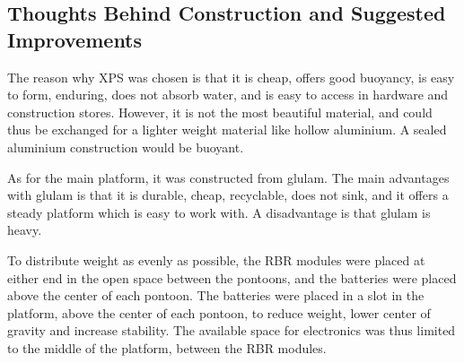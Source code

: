 \subsection{Thoughts Behind Construction and Suggested Improvements}
The reason why XPS was chosen is that it is cheap, offers good buoyancy, is easy to form, enduring, does not absorb water, and is easy to access in hardware and construction stores. However, it is not the most beautiful material, and could thus be exchanged for a lighter weight material like hollow aluminium. A sealed aluminium construction would be buoyant.

As for the main platform, it was constructed from glulam. The main advantages with glulam is that it is durable, cheap, recyclable, does not sink, and it offers a steady platform which is easy to work with. A disadvantage is that glulam is heavy.




To distribute weight as evenly as possible, the RBR modules were placed at either end in the open space between the pontoons, and the batteries were placed above the center of each pontoon. The batteries were placed in a slot in the platform, above the center of each pontoon, to reduce weight, lower center of gravity and increase stability. The available space for electronics was thus limited to the middle of the platform, between the RBR modules.

